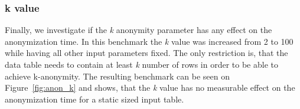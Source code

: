 \subsubsection{k value}

Finally, we investigate if the \emph{k} anonymity parameter has any effect on the anonymization time. In this benchmark the \emph{k} value was increased from 2 to 100 while having all other input parameters fixed. The only restriction is, that the data table needs to contain at least \emph{k} number of rows in order to be able to achieve k-anonymity. The resulting benchmark can be seen on Figure~\ref{fig:anon_k} and shows, that the \emph{k} value has no measurable effect on the anonymization time for a static sized input table.

\vspace{\baselineskip}
